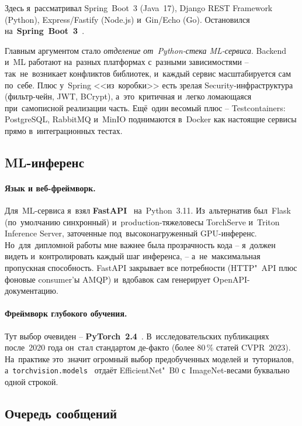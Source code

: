 \documentclass[a4paper,12pt]{diplom}
\begin{document}
Здесь я~рассматривал Spring~Boot~3 (Java~17), Django REST Framework (Python), Express/Fastify (Node.js) и~Gin/Echo (Go). Остановился на~\textbf{Spring~Boot~3}~\cite{SpringDocs}.

Главным аргументом стало \emph{отделение от~Python-стека ML-сервиса}. Backend и~ML работают на~разных платформах с~разными зависимостями -- так~не~возникает конфликтов библиотек, и~каждый сервис масштабируется сам по~себе. Плюс у~Spring <<из~коробки>> есть зрелая Security-инфраструктура (фильтр-чейн, JWT, BCrypt), а~это~критичная и~легко ломающаяся при~самописной реализации часть. Ещё~один весомый плюс -- Testcontainers: PostgreSQL, RabbitMQ и~MinIO поднимаются в~Docker как настоящие сервисы прямо в~интеграционных тестах.

\subsection{ML-инференс}

\paragraph{Язык и веб-фреймворк.} Для~ML-сервиса я~взял \textbf{FastAPI}~\cite{FastAPIDocs} на~Python~3.11. Из~альтернатив был~Flask (по~умолчанию синхронный) и~production-тяжеловесы TorchServe и~Triton Inference Server, заточенные под~высоконагруженный GPU-инференс. Но~для~дипломной работы мне важнее была прозрачность кода -- я~должен видеть и~контролировать каждый шаг инференса, -- а~не~максимальная пропускная способность. FastAPI закрывает все потребности (HTTP"~API плюс фоновые consumer'ы AMQP) и~вдобавок сам генерирует OpenAPI-документацию.

\paragraph{Фреймворк глубокого обучения.} Тут выбор очевиден -- \textbf{PyTorch~2.4}~\cite{TorchDocs}. В~исследовательских публикациях после~2020 года он~стал стандартом де-факто (более 80\,\% статей CVPR~2023). На~практике это~значит огромный выбор предобученных моделей и~туториалов, а~\texttt{torchvision.models}~\cite{TorchVisionDocs} отдаёт EfficientNet"~B0 с~ImageNet-весами буквально одной строкой.

\subsection{Очередь сообщений}
\end{document}
